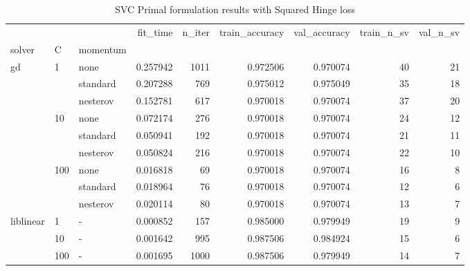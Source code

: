 \begin{table}[H]
\centering
\caption{SVC Primal formulation results with Squared Hinge loss}
\label{primal_svc_squared_hinge_cv_results}
\begin{tabular}{lllrrrrrr}
\toprule
          &     &   &  fit\_time &  n\_iter &  train\_accuracy &  val\_accuracy &  train\_n\_sv &  val\_n\_sv \\
solver & C & momentum &           &         &                 &               &             &           \\
\midrule
gd & 1   & none &  0.257942 &    1011 &        0.972506 &      0.970074 &          40 &        21 \\
          &     & standard &  0.207288 &     769 &        0.975012 &      0.975049 &          35 &        18 \\
          &     & nesterov &  0.152781 &     617 &        0.970018 &      0.970074 &          37 &        20 \\
          & 10  & none &  0.072174 &     276 &        0.970018 &      0.970074 &          24 &        12 \\
          &     & standard &  0.050941 &     192 &        0.970018 &      0.970074 &          21 &        11 \\
          &     & nesterov &  0.050824 &     216 &        0.970018 &      0.970074 &          22 &        10 \\
          & 100 & none &  0.016818 &      69 &        0.970018 &      0.970074 &          16 &         8 \\
          &     & standard &  0.018964 &      76 &        0.970018 &      0.970074 &          12 &         6 \\
          &     & nesterov &  0.020114 &      80 &        0.970018 &      0.970074 &          13 &         7 \\
liblinear & 1   & - &  0.000852 &     157 &        0.985000 &      0.979949 &          19 &         9 \\
          & 10  & - &  0.001642 &     995 &        0.987506 &      0.984924 &          15 &         6 \\
          & 100 & - &  0.001695 &    1000 &        0.987506 &      0.979949 &          14 &         7 \\
\bottomrule
\end{tabular}
\end{table}

